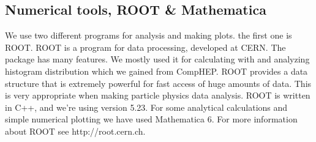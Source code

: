 \subsection{Numerical tools, ROOT \& Mathematica}
We use two different programs for analysis and making plots. the first one is ROOT. ROOT is a program for data processing, developed at CERN. The package has many features. We mostly used it for calculating with and analyzing histogram distribution which we gained from CompHEP. ROOT provides a data structure that is extremely powerful for fast access of huge amounts of data. This is very appropriate when making particle physics data analysis. ROOT is written in C++, and we're using version 5.23. For some analytical calculations and simple numerical plotting we have used Mathematica 6. For more information about ROOT see http://root.cern.ch.
